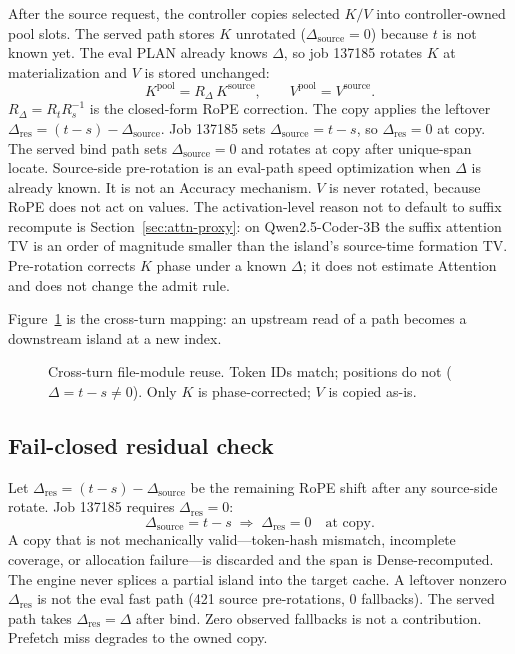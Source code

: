 After the source request, the controller copies selected $K/V$ into
controller-owned pool slots. The served path stores $K$ unrotated
($\Delta_{\mathrm{source}}{=}0$) because $t$ is not known yet. The eval
PLAN already knows $\Delta$, so job 137185 rotates $K$ at
materialization and $V$ is stored unchanged:
\begin{equation}
K^{\mathrm{pool}} = R_{\Delta}\, K^{\mathrm{source}}, \qquad
V^{\mathrm{pool}} = V^{\mathrm{source}}.
\label{eq:prerotate}
\end{equation}
$R_{\Delta} = R_{t} R_{s}^{-1}$ is the closed-form RoPE correction. The copy applies the leftover
$\Delta_{\mathrm{res}} = (t-s) - \Delta_{\mathrm{source}}$.
Job 137185 sets $\Delta_{\mathrm{source}} = t-s$, so
$\Delta_{\mathrm{res}} = 0$ at copy. The served bind path sets
$\Delta_{\mathrm{source}} = 0$ and rotates at copy after unique-span
locate. Source-side pre-rotation is an eval-path speed optimization
when $\Delta$ is already known. It is not an Accuracy mechanism. $V$ is never rotated, because RoPE does not act on values.
The activation-level reason not to default to suffix recompute is
Section~\ref{sec:attn-proxy}: on Qwen2.5-Coder-3B the suffix attention
TV is an order of magnitude smaller than the island's source-time
formation TV. Pre-rotation corrects $K$ phase under a known $\Delta$;
it does not estimate Attention and does not change the admit rule.

Figure~\ref{fig:kv-reuse} is the cross-turn mapping: an upstream read of
a path becomes a downstream island at a new index.

\begin{figure}[ht]
\centering
\resizebox{\columnwidth}{!}{}
\caption{Cross-turn file-module reuse. Token IDs match; positions do not
($\Delta=t-s\neq 0$). Only $K$ is phase-corrected; $V$ is copied as-is.}
\label{fig:kv-reuse}
\end{figure}

\subsection{Fail-closed residual check}

Let $\Delta_{\mathrm{res}} = (t-s) - \Delta_{\mathrm{source}}$ be the
remaining RoPE shift after any source-side rotate. Job 137185
requires $\Delta_{\mathrm{res}} = 0$:
\begin{equation}
\Delta_{\mathrm{source}} = t - s
\;\Rightarrow\;
\Delta_{\mathrm{res}} = 0
\quad\text{at copy.}
\label{eq:fail-closed}
\end{equation}
A copy that is not mechanically valid---token-hash mismatch, incomplete
coverage, or allocation failure---is discarded and the span is
Dense-recomputed. The engine never splices a partial island into the
target cache. A leftover nonzero $\Delta_{\mathrm{res}}$ is not the eval fast path
(421 source pre-rotations, 0 fallbacks). The served path takes
$\Delta_{\mathrm{res}}=\Delta$ after bind. Zero observed fallbacks is
not a contribution. Prefetch miss degrades to the owned copy.

